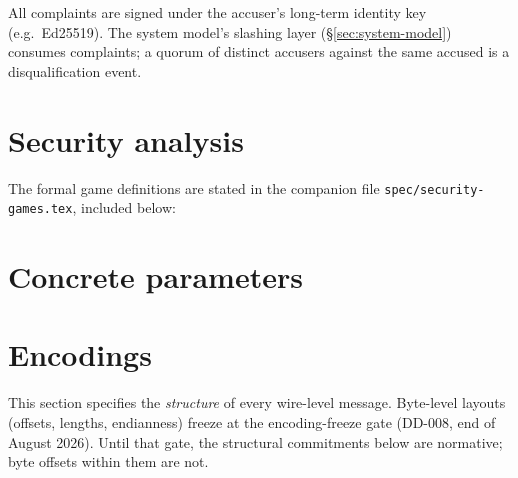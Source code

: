 \documentclass[11pt,a4paper]{article}
\theoremstyle{definition}
\theoremstyle{remark}
\begin{document}
All complaints are signed under the accuser's long-term identity key
(e.g.\ Ed25519). The system model's slashing layer
(\S\ref{sec:system-model}) consumes complaints; a quorum of distinct
accusers against the same accused is a disqualification event.

\section{Security analysis}
\label{sec:security}

The formal game definitions are stated in the companion file
\texttt{spec/security-games.tex}, included below:



\section{Concrete parameters}
\label{sec:parameters}



\section{Encodings}
\label{sec:encodings}

This section specifies the \emph{structure} of every wire-level
message. Byte-level layouts (offsets, lengths, endianness) freeze at
the encoding-freeze gate (DD-008, end of August 2026). Until that
gate, the structural commitments below are normative; byte offsets
within them are not.
\end{document}
